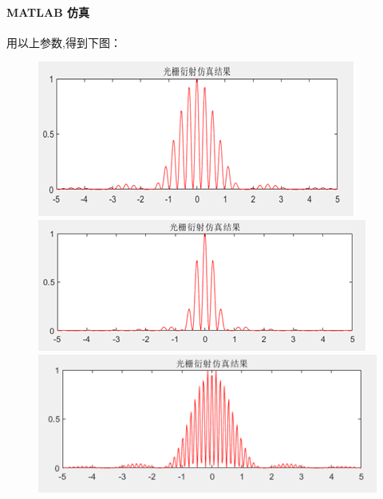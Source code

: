 \documentclass[a4paper]{../phyreport}
\begin{document}
\paragraph{MATLAB 仿真}用以上参数,得到下图：
\begin{figure}[H]
  \centering
  \begin{minipage}[b]{0.45\linewidth}
    \centering
\includegraphics[width=0.9\linewidth]{fig/仿真/0.040.25.png}
  \end{minipage}
  \begin{minipage}[b]{0.45\linewidth}
    \centering
\includegraphics[width=0.9\linewidth]{fig/仿真/0.080.25.png}
  \end{minipage}
  \begin{minipage}[b]{0.45\linewidth}
    \centering
\includegraphics[width=0.9\linewidth]{fig/仿真/0.040.50.png}
  \end{minipage}

\end{figure}
\end{document}
